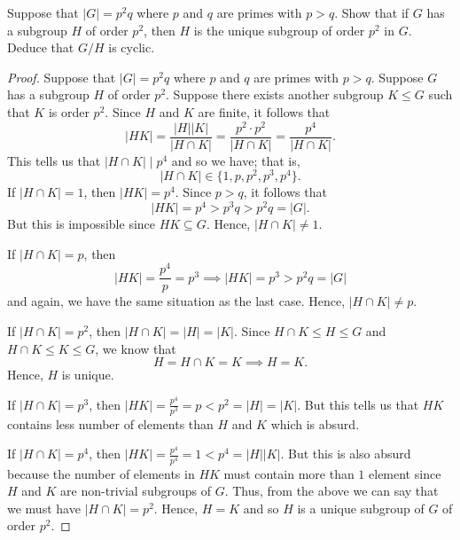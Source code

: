 \documentclass[a4paper]{article}
\begin{document}
\begin{problem}
    Suppose that \( | G  |  = p^{2} q  \) where \( p  \) and \( q  \) are primes with \( p > q  \). Show that if \( G  \) has a subgroup \( H  \) of order \( p^{2} \), then \( H  \) is the unique subgroup of order \( p^{2} \) in \( G  \). Deduce that \( G / H  \) is cyclic.
\end{problem}
\begin{proof}
Suppose that \( | G  |  = p^{2} q  \) where \( p  \) and \( q  \) are primes with \( p > q  \). Suppose \( G  \) has a subgroup \(  H  \) of order \( p^{2} \). Suppose there exists another subgroup \( K \leq G \) such that \( K  \) is order \( p^{2}  \). Since \( H  \) and \( K  \) are finite, it follows that  
\[  | HK  |  = \frac{ | H  |  | K  |  }{  | H \cap K  |  }  = \frac{ p^{2} \cdot p^{2} }{ | H \cap K  |   }  = \frac{ p^{4} }{ | H \cap K |  }. \]
This tells us that \( | H \cap K |  \mid p^{4} \) and so we have; that is, 
\[  | H \cap K |  \in \{  1, p , p^{2} , p^{3}, p^{4} \}. \]
If \( | H \cap K  |  = 1  \), then \( | HK |  = p^{4} \). Since \( p > q  \), it follows that 
\[  | HK |  = p^{4} > p^{3} q > p^{2}q = | G  |.  \]
But this is impossible since \( HK \subseteq  G  \). Hence, \( | H \cap K |  \neq 1 \).

If \( | H \cap K |  = p \), then
\[  | HK  |  = \frac{ p^{4} }{ p  }  = p^{3} \implies | HK |  = p^{3} > p^{2}q = | G  |  \]
and again, we have the same situation as the last case. Hence, \( | H \cap K |  \neq p \).

If \( | H \cap K |  = p^{2} \), then \( | H \cap K | = | H |  = | K |  \). Since \( H \cap K \leq H \leq G   \) and \( H \cap K \leq K \leq G  \), we know that 
\[ H = H \cap K = K \implies H = K. \]
Hence, \( H  \) is unique.

If \( | H \cap K  | = p^{3}  \), then \( | HK |  = \frac{ p^{4} }{ p^{3}}  = p < p^{2} = | H  |  = | K |   \). But this tells us that \( HK \) contains less number of elements than \( H  \) and \( K  \) which is absurd. 

If \( | H \cap K | = p^{4} \), then \( | HK | = \frac{ p^{4}  }{  p^{4}  }  = 1  < p^{4} = | H |  | K | \). But this is also absurd because the number of elements in \( HK  \) must contain more than \( 1  \) element since \( H  \) and \( K  \) are non-trivial subgroups of \( G  \).  Thus, from the above we can say that we must have \( | H \cap K |  = p^{2} \). Hence, \( H = K  \) and so \( H  \) is a unique subgroup of \( G  \) of order \( p^{2} \).
\end{proof}
\end{document}

